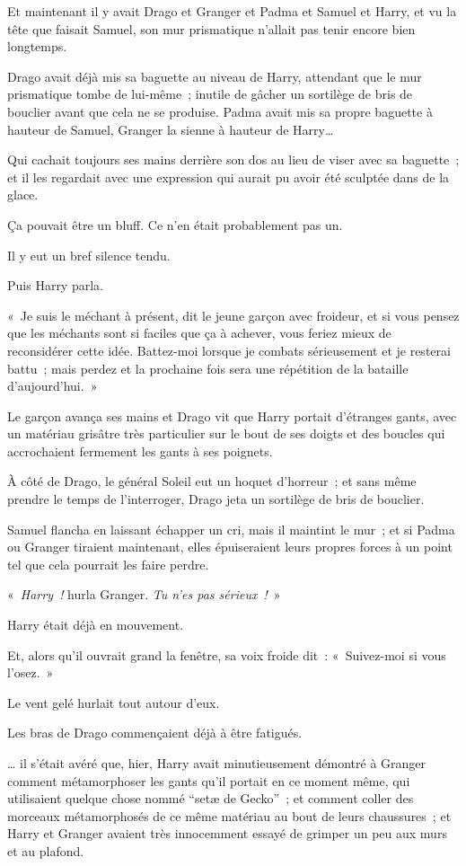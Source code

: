 Et maintenant il y avait Drago et Granger et Padma et Samuel et Harry, et vu la tête que faisait Samuel, son mur prismatique n'allait pas tenir encore bien longtemps.

Drago avait déjà mis sa baguette au niveau de Harry, attendant que le mur prismatique tombe de lui-même~; inutile de gâcher un sortilège de bris de bouclier avant que cela ne se produise. Padma avait mis sa propre baguette à hauteur de Samuel, Granger la sienne à hauteur de Harry…

Qui cachait toujours ses mains derrière son dos au lieu de viser avec sa baguette~; et il les regardait avec une expression qui aurait pu avoir été sculptée dans de la glace.

Ça pouvait être un bluff. Ce n'en était probablement pas un.

Il y eut un bref silence tendu.

Puis Harry parla.

«~Je suis le méchant à présent, dit le jeune garçon avec froideur, et si vous pensez que les méchants sont si faciles que ça à achever, vous feriez mieux de reconsidérer cette idée. Battez-moi lorsque je combats sérieusement et je resterai battu~; mais perdez et la prochaine fois sera une répétition de la bataille d'aujourd'hui.~»

Le garçon avança ses mains et Drago vit que Harry portait d'étranges gants, avec un matériau grisâtre très particulier sur le bout de ses doigts et des boucles qui accrochaient fermement les gants à ses poignets.

À côté de Drago, le général Soleil eut un hoquet d'horreur~; et sans même prendre le temps de l'interroger, Drago jeta un sortilège de bris de bouclier.

Samuel flancha en laissant échapper un cri, mais il maintint le mur~; et si Padma ou Granger tiraient maintenant, elles épuiseraient leurs propres forces à un point tel que cela pourrait les faire perdre.

«~\emph{Harry~!} hurla Granger. \emph{Tu n'es pas sérieux~!}~»

Harry était déjà en mouvement.

Et, alors qu'il ouvrait grand la fenêtre, sa voix froide dit~: «~Suivez-moi si vous l'osez.~»

\later

Le vent gelé hurlait tout autour d'eux.

Les bras de Drago commençaient déjà à être fatigués.

… il s'était avéré que, hier, Harry avait minutieusement démontré à Granger comment métamorphoser les gants qu'il portait en ce moment même, qui utilisaient quelque chose nommé “setæ de Gecko”~; et comment coller des morceaux métamorphosés de ce même matériau au bout de leurs chaussures~; et Harry et Granger avaient très innocemment essayé de grimper un peu aux murs et au plafond.

